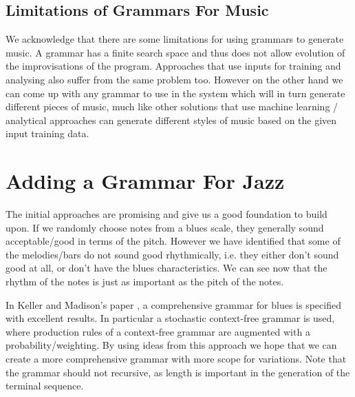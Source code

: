 \documentclass[pdftex,12pt,a4paper]{report}
\begin{document}
\subsection{Limitations of Grammars For Music} \label{grammarissues}
We acknowledge that there are some limitations for using grammars to generate music. A grammar has a finite search space and thus does not allow evolution of the improvisations of the program. Approaches that use inputs for training and analysing also suffer from the same problem too. However on the other hand we can come up with any grammar to use in the system which will in turn generate different pieces of music, much like other solutions that use machine learning / analytical approaches can generate different styles of music based on the given input training data.

\section{Adding a Grammar For Jazz}
The initial approaches are promising and give us a good foundation to build upon. If we randomly choose notes from a blues scale, they generally sound acceptable/good in terms of the pitch. However we have identified that some of the melodies/bars do not sound good rhythmically, i.e. they either don't sound good at all, or don't have the blues characteristics. We can see now that the rhythm of the notes is just as important as the pitch of the notes. 

In Keller and Madison's paper \cite{keller07}, a comprehensive grammar for blues is specified with excellent results. In particular a stochastic context-free grammar is used, where production rules of a context-free grammar are augmented with a probability/weighting. By using ideas from this approach we hope that we can create a more comprehensive grammar with more scope for variations. Note that the grammar should not recursive, as length is important in the generation of the terminal sequence. 
\end{document}
